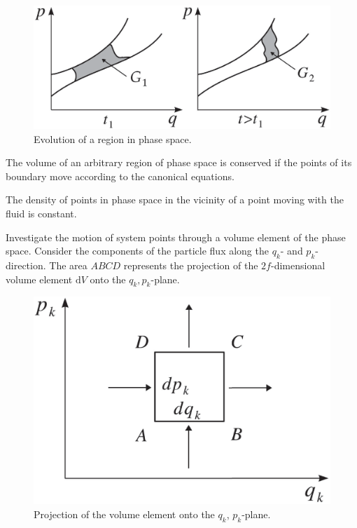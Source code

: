 \documentclass[11pt,a4paper]{article}
\newcommand{\dif}{\mathrm{d}}
\newcounter{theo}[section]\setcounter{theo}{0}
\begin{document}
\begin{figure}
\centering
\includegraphics[height=5.cm,angle=0]{Evolution.eps}
\caption{
Evolution of a region in phase space.
} 
\label{fig:evolution}
\end{figure}


\begin{tcolorbox}[colback=green!5,colframe=green!40!black,title= Liouville theorem]
The volume of an arbitrary region of phase space is conserved if the points of its boundary move according to the canonical equations.
\end{tcolorbox}
\begin{tcolorbox}[colback=green!5,colframe=green!40!black,title= Liouville theorem]
The density of points in phase space in the vicinity of a point moving with the fluid is constant.
\end{tcolorbox}
Investigate the motion of system points through a volume element of the phase space. Consider the components of the particle flux along the $q_k$- and $p_k$-direction. The area $ABCD$ represents the projection of the $2f$-dimensional volume element $\dif V$ onto the $q_k, p_k$-plane. 

\begin{figure}
\centering
\includegraphics[height=5.cm,angle=0]{Projection.eps}
\caption{
Projection of the volume element onto the $q_k$, $p_k$-plane.
} 
\label{fig:evolution}
\end{figure}
\end{document}
